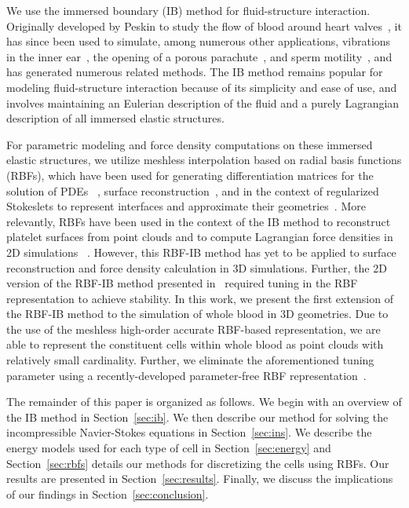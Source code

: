 We use the immersed boundary (IB) method for fluid-structure interaction. Originally
developed by Peskin to study the flow of blood around heart valves~\cite{Peskin:1972wa},
it has since been used to simulate, among numerous other applications, vibrations in the
inner ear~\cite{BeyerJr:1990tb}, the opening of a porous parachute~\cite{Kim:2006ku}, and
sperm motility~\cite{Dillon:2011cu}, and has generated numerous related methods. The IB
method remains popular for modeling fluid-structure interaction because of its simplicity
and ease of use, and involves maintaining an Eulerian description of the fluid and a
purely Lagrangian description of all immersed elastic structures.

For parametric modeling and force density computations on these immersed elastic
structures, we utilize meshless interpolation based on radial basis functions (RBFs),
which have been used for generating differentiation matrices for the solution of PDEs~%
\cite{Fasshauer:2007ui}, surface reconstruction~\cite{Hardy:1971tb,Carr:2001tb,
Shankar:2013ki, SFKSISC2018}, and in the context of regularized Stokeslets to represent
interfaces and approximate their geometries~\cite{Olson:2015ja}. More relevantly, RBFs
have been used in the context of the IB method to reconstruct platelet surfaces from
point clouds and to compute Lagrangian force densities in 2D simulations~%
\cite{Shankar:2015km}. However, this RBF-IB method has yet to be applied to surface
reconstruction and force density calculation in 3D simulations. Further, the 2D version
of the RBF-IB method presented in~\cite{Shankar:2015km} required tuning in the RBF
representation to achieve stability. In this work, we present the first extension of the
RBF-IB method to the simulation of whole blood in 3D geometries. Due to the use of the
meshless high-order accurate RBF-based representation, we are able to represent the
constituent cells within whole blood as point clouds with relatively small cardinality.
Further, we eliminate the aforementioned tuning parameter using a recently-developed
parameter-free RBF representation~\cite{SFKSISC2018}.

The remainder of this paper is organized as follows. We begin with an overview of the IB
method in Section~\ref{sec:ib}. We then describe our method for solving the
incompressible Navier-Stokes equations in Section~\ref{sec:ins}. We describe the energy
models used for each type of cell in Section~\ref{sec:energy} and Section~\ref{sec:rbfs}
details our methods for discretizing the cells using RBFs. Our results are presented in
Section~\ref{sec:results}. Finally, we discuss the implications of our findings in
Section~\ref{sec:conclusion}.

